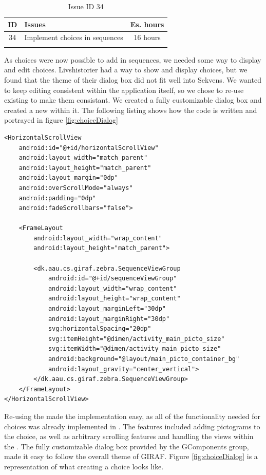 \begin{longtable} { | c | p{12cm} | c | } 
\hline
	ID 	&	Issues	&		 Es. hours \\\hline
	34 	&	Implement choices in sequences	&	16 hours \\\hline
\caption{Issue ID 34}
\label{tab:spr3_choicesinsequences}
\end{longtable}

As choices were now possible to add in sequences, we needed some way to display and edit choices. Livshistorier had a way to show and display choices, but we found that the theme of their dialog box did not fit well into Sekvens. We wanted to keep editing consistent within the application itself, so we chose to re-use existing  to make them consistant. We created a fully customizable dialog box and created a new  within it. The following listing shows how the code is written and portrayed in figure \ref{fig:choiceDialog}

\begin{lstlisting}
<HorizontalScrollView
    android:id="@+id/horizontalScrollView"
    android:layout_width="match_parent"
    android:layout_height="match_parent"
    android:layout_margin="0dp"
    android:overScrollMode="always"
    android:padding="0dp"
    android:fadeScrollbars="false">

    <FrameLayout
        android:layout_width="wrap_content"
        android:layout_height="match_parent">

        <dk.aau.cs.giraf.zebra.SequenceViewGroup
            android:id="@+id/sequenceViewGroup"
            android:layout_width="wrap_content"
            android:layout_height="wrap_content"
            android:layout_marginLeft="30dp"
            android:layout_marginRight="30dp"
            svg:horizontalSpacing="20dp"
            svg:itemHeight="@dimen/activity_main_picto_size"
            svg:itemWidth="@dimen/activity_main_picto_size"
            android:background="@layout/main_picto_container_bg"
            android:layout_gravity="center_vertical">
        </dk.aau.cs.giraf.zebra.SequenceViewGroup>
    </FrameLayout>
</HorizontalScrollView>
\end{lstlisting}

Re-using the made the implementation easy, as all of the functionality needed for choices was already implemented in . The features included adding pictograms to the choice, as well as arbitrary scrolling features and handling the views within the . The fully customizable dialog box provided by the GComponents group, made it easy to follow the overall theme of GIRAF. Figure \ref{fig:choiceDialog} is a representation of what creating a choice looks like.

